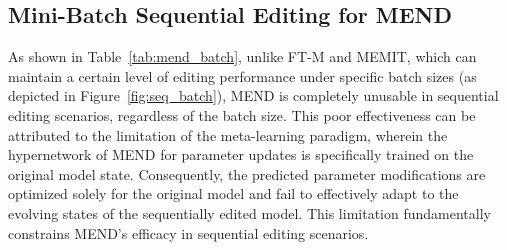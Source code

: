 \subsection{Mini-Batch Sequential Editing for MEND}
\label{apd:mini_batch_seq}

As shown in Table~\ref{tab:mend_batch}, unlike FT-M and MEMIT, which can maintain a certain level of editing performance under specific batch sizes (as depicted in Figure~\ref{fig:seq_batch}), MEND is completely unusable in sequential editing scenarios, regardless of the batch size. 
This poor effectiveness can be attributed to the limitation of the meta-learning paradigm, wherein the hypernetwork of MEND for parameter updates is specifically trained on the original model state. 
Consequently, the predicted parameter modifications are optimized solely for the original model and fail to effectively adapt to the evolving states of the sequentially edited model.
This limitation fundamentally constrains MEND's efficacy in sequential editing scenarios.












